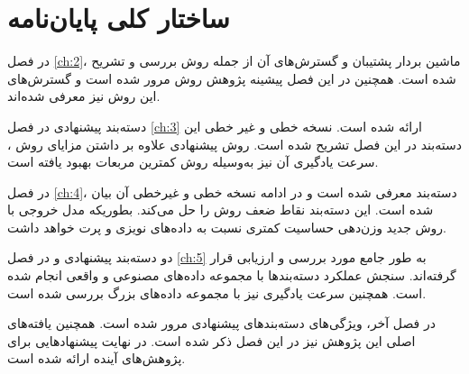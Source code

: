 \section{ساختار کلی  پایان‌نامه}\label{sec:1:4}
در فصل \ref{ch:2}، ماشین بردار پشتیبان و گسترش‌های آن از جمله روش  بررسی و تشریح شده است. همچنین در این فصل پیشینه پژوهش روش   مرور شده است و گسترش‌های این روش نیز معرفی شده‌اند.

دسته‌بند پیشنهادی  در فصل \ref{ch:3} ارائه شده است.  نسخه خطی و غیر خطی این دسته‌بند در این فصل تشریح شده است. روش پیشنهادی علاوه بر داشتن مزایای روش   ، سرعت یادگیری آن نیز به‌وسیله روش کمترین مربعات بهبود یافته است.

در فصل \ref{ch:4}، دسته‌بند  معرفی شده است و در ادامه نسخه خطی و غیرخطی آن بیان شده است. این دسته‌بند نقاط ضعف روش  را حل می‌کند. بطوریکه مدل خروجی با روش جدید وزن‌دهی حساسیت کمتری نسبت به داده‌های نویزی و پرت خواهد داشت.

دو دسته‌بند پیشنهادی  و  در فصل \ref{ch:5} به طور جامع مورد بررسی و ارزیابی قرار گرفته‌اند.   سنجش عملکرد دسته‌بندها با مجموعه داده‌های مصنوعی و واقعی انجام شده است. همچنین سرعت یادگیری نیز با مجموعه داده‌های بزرگ بررسی شده است.

در فصل آخر، ویژگی‌های دسته‌بندهای پیشنهادی مرور شده است. همچنین یافته‌های اصلی این پژوهش نیز در این فصل ذکر شده است. در نهایت پیشنهادهایی برای پژوهش‌های آینده ارائه شده است. 
\newpage
